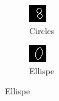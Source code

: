 \documentclass[conference]{IEEEtran}
\begin{document}
\begin{figure}[h]
\begin{subfigure}{.20\columnwidth}
        \includegraphics[width=.90\textwidth]{./images/issues/excluded-G-0-circle.png}
        \caption{Circles}
    \end{subfigure}%
    \begin{subfigure}{.20\columnwidth}
        \centering
        \includegraphics[width=.90\textwidth]{./images/issues/excluded-G-0-el-circle.png}
        \caption{Ellispe}

\end{subfigure}
\end{figure}
\end{document}
